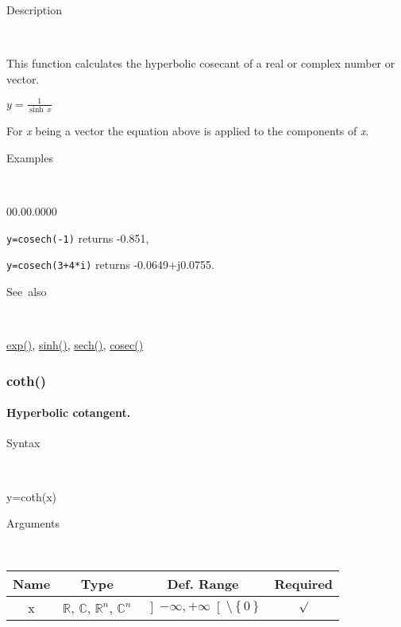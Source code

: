 \begin{description}
\item [Description]~
\end{description}
This function calculates the hyperbolic cosecant of a real or complex
number or vector.

\medskip{}
$y={\displaystyle \frac{1}{\sinh\, x}}$ 
\medskip{}

For \textit{x} being a vector the equation above is applied
to the components of \textit{x}.

\begin{description}
\item [Examples]~
\end{description}
\begin{lyxlist}{00.00.0000}
\item [\texttt{y=cosech(-1)}]returns -0.851,
\item [\texttt{y=cosech(3+4{*}i)}]returns -0.0649+j0.0755.
\end{lyxlist}
\begin{description}
\item [See~also]~
\end{description}
\textcolor{blue}{\hyperlink{exp}{exp()}}\textcolor{black}{,} \textcolor{blue}{\hyperlink{sinh}{sinh()}}\textcolor{black}{,}
\textcolor{blue}{\hyperlink{sech}{sech()}}\textcolor{black}{,} \textcolor{blue}{\hyperlink{cosec}{cosec()}}


\newpage
\subsubsection*{\hypertarget{coth}{}{\Large coth()}}


\paragraph{\label{par:Hyperbolic-cotangent}Hyperbolic cotangent.}

\begin{description}
\item [Syntax]~
\end{description}
y=coth(x)

\begin{description}
\item [Arguments]~
\end{description}
\begin{tabular}{|c|c|c|c|}
\hline 
Name&
Type&
Def. Range&
Required\tabularnewline
\hline
\hline 
x&
$\mathbb{R}$, $\mathbb{C}$, $\mathbb{R}^{n}$, $\mathbb{C}^{n}$&
$\left]-\infty,+\infty\right[$$\setminus\left\{ 0\right\} $&
$\surd$\tabularnewline
\hline
\end{tabular}

